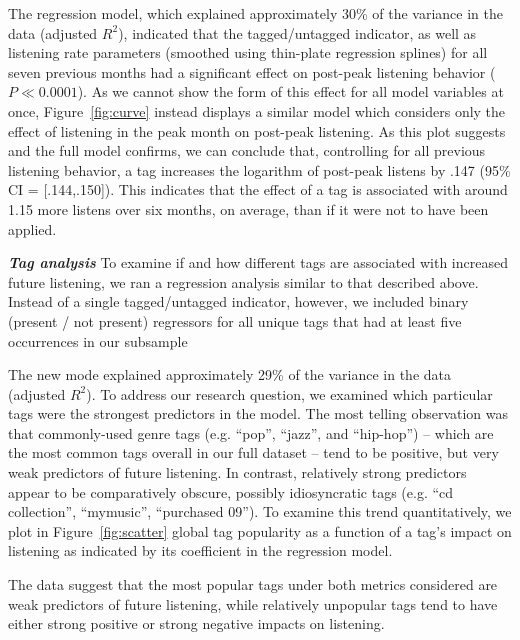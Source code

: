 \documentclass[preprint]{sig-alternate-2013}
\begin{document}
The regression model, which explained approximately 30\% of the variance in the data (adjusted $R^{2}$), indicated that the tagged/untagged indicator, as well as listening rate parameters (smoothed using thin-plate regression splines) for all seven previous months had a significant effect on post-peak listening behavior ($P \ll 0.0001$). As we cannot show the form of this effect for all model variables at once, Figure~\ref{fig:curve} instead displays a similar model which considers only the effect of listening in the peak month on post-peak listening. As this plot suggests and the full model confirms, we can conclude that, controlling for all previous listening behavior, a tag increases the logarithm of post-peak listens by .147 (95\% CI = [.144,.150]). This indicates that the effect of a tag is associated with around 1.15 more listens over six months, on average, than if it were not to have been applied.   

\textbf{\textit{Tag analysis}} To examine if and how different tags are associated with increased future listening, we ran a regression analysis similar to that described above. Instead of a single tagged/untagged indicator, however, we included binary (present / not present) regressors for all unique tags that had at least five occurrences in our subsample

The new  mode explained approximately 29\% of the variance in the data (adjusted $R^{2}$). To address our research question, we examined which particular tags were the strongest predictors in the model. The most telling observation was that commonly-used genre tags (e.g. ``pop'', ``jazz'', and ``hip-hop'') -- which are the most common tags overall in our full dataset -- tend to be positive, but very weak predictors of future listening. In contrast, relatively strong predictors appear to be comparatively obscure, possibly idiosyncratic tags (e.g. ``cd collection'', ``mymusic'', ``purchased 09''). To examine this trend quantitatively, we plot in Figure~\ref{fig:scatter} global tag popularity as a function of a tag's impact on listening as indicated by its coefficient in the regression model. 

The data suggest that the most popular tags under both metrics considered are weak predictors of future listening, while relatively unpopular tags tend to have either strong positive or strong negative impacts on listening. 
\end{document}
